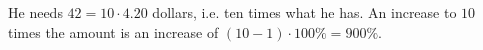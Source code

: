 He needs $42=10\cdot4.20$ dollars, i.e. ten times what he has. An increase to $10$ times the amount is an increase of $(10-1)\cdot100\%=\boxed{900\%}$.
